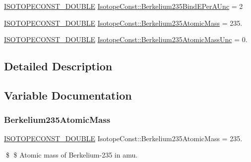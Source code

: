 \begin{DoxyCompactItemize}
\mbox{\hyperlink{group___isotope_const-_macros_ga8f45a7272ce02c0b4c65c44636ed719a}{I\+S\+O\+T\+O\+P\+E\+C\+O\+N\+S\+T\+\_\+\+D\+O\+U\+B\+LE}} \mbox{\hyperlink{group___isotope_const-_berkelium-_bk235_gaccc26fd4a3a546648d3002662207d766}{Isotope\+Const\+::\+Berkelium235\+Bind\+E\+Per\+A\+Unc}} = 2
\item 
\mbox{\hyperlink{group___isotope_const-_macros_ga8f45a7272ce02c0b4c65c44636ed719a}{I\+S\+O\+T\+O\+P\+E\+C\+O\+N\+S\+T\+\_\+\+D\+O\+U\+B\+LE}} \mbox{\hyperlink{group___isotope_const-_berkelium-_bk235_gad1a035c3135b5dd77964e41df7aeea7b}{Isotope\+Const\+::\+Berkelium235\+Atomic\+Mass}} = 235.
\item 
\mbox{\hyperlink{group___isotope_const-_macros_ga8f45a7272ce02c0b4c65c44636ed719a}{I\+S\+O\+T\+O\+P\+E\+C\+O\+N\+S\+T\+\_\+\+D\+O\+U\+B\+LE}} \mbox{\hyperlink{group___isotope_const-_berkelium-_bk235_ga9bcfe2ea1f4a37e476cad39358bae2ad}{Isotope\+Const\+::\+Berkelium235\+Atomic\+Mass\+Unc}} = 0.
\end{DoxyCompactItemize}


\subsection{Detailed Description}


\subsection{Variable Documentation}
\mbox{\label{group___isotope_const-_berkelium-_bk235_gad1a035c3135b5dd77964e41df7aeea7b}} 
\subsubsection{\texorpdfstring{Berkelium235\+Atomic\+Mass}{Berkelium235AtomicMass}}
{\footnotesize\ttfamily \mbox{\hyperlink{group___isotope_const-_macros_ga8f45a7272ce02c0b4c65c44636ed719a}{I\+S\+O\+T\+O\+P\+E\+C\+O\+N\+S\+T\+\_\+\+D\+O\+U\+B\+LE}} Isotope\+Const\+::\+Berkelium235\+Atomic\+Mass = 235.}

\$ \$ Atomic mass of Berkelium-\/235 in amu. \mbox{\label{group___isotope_const-_berkelium-_bk235_ga9bcfe2ea1f4a37e476cad39358bae2ad}} 
